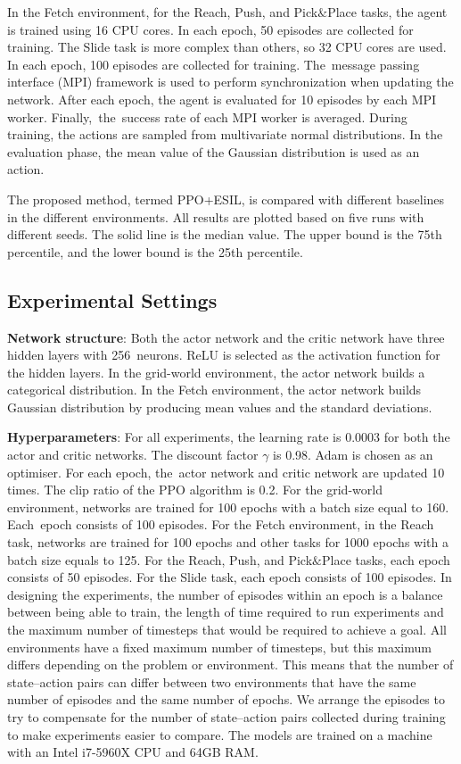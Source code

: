 In the Fetch environment, for the Reach, Push, and Pick$\&$Place tasks, the agent is trained using 16 CPU cores. In each epoch, 50 episodes are collected for training. The Slide task is more complex than others, so 32 CPU cores are used. In each epoch, 100 episodes are collected for training. The~{message passing interface (MPI) framework is used to perform} synchronization when updating the network. After each epoch, the agent is evaluated for 10 episodes by each MPI worker. Finally,~the~success rate of each MPI worker is averaged. During training, the actions are sampled from {multivariate normal} distributions. In the evaluation phase, the mean value of the Gaussian distribution is used as an action. 

The proposed method, termed PPO+ESIL, is compared with different baselines in the different environments. All results are plotted based on five runs with different seeds. The solid line is the median value. The upper bound is the {75th} percentile, and the lower bound is the {25th} percentile.

\subsection{Experimental Settings}
\textbf{Network structure}: Both the actor network and the critic network have three hidden layers with 256~neurons. ReLU is selected as the activation function for the hidden layers. In the grid-world environment, the actor network builds a categorical distribution. In the Fetch environment, the actor network builds Gaussian {distribution by producing mean values and the standard deviations}.

\textbf{Hyperparameters}: For all experiments, the learning rate is 0.0003 for both the actor and critic networks. The discount factor $\gamma$ is 0.98. Adam is chosen as an optimiser. For each epoch, the~actor network and critic network are updated 10 times. The clip ratio of the PPO algorithm is 0.2. For the grid-world environment, networks are trained for 100 epochs with a batch size equal to 160. Each~epoch consists of 100 episodes. For the Fetch environment, in the Reach task, networks are trained for 100 epochs and other tasks for 1000 epochs with a batch size equals to 125. For the Reach, Push, and Pick$\&$Place tasks, each epoch consists of 50 episodes. For the Slide task, each epoch consists of 100 episodes. In designing the experiments, the number of episodes within an epoch is a balance between being able to train, the length of time required to run experiments and the maximum number of timesteps that would be required to achieve a goal. All environments have a fixed maximum number of timesteps, but this maximum differs depending on the problem or environment. This means that the number of state--action pairs can differ between two environments that have the same number of episodes and the same number of epochs. We arrange the episodes to try to compensate for the number of state--action pairs collected during training to make experiments easier to compare. The models are trained on a machine with an Intel i7-5960X CPU and 64GB RAM.

